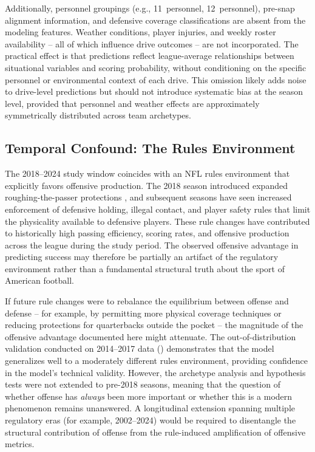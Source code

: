 Additionally, personnel groupings (e.g., 11~personnel, 12~personnel), pre-snap
alignment information, and defensive coverage classifications are absent from
the modeling features. Weather conditions, player injuries, and weekly roster
availability -- all of which influence drive outcomes -- are not incorporated. The
practical effect is that \xscore{} predictions reflect league-average
relationships between situational variables and scoring probability, without
conditioning on the specific personnel or environmental context of each drive.
This omission likely adds noise to drive-level predictions but should not
introduce systematic bias at the season level, provided that personnel and
weather effects are approximately symmetrically distributed across team
archetypes.

\subsection{Temporal Confound: The Rules Environment}
\label{sec:lim-temporal}

The 2018--2024 study window coincides with an NFL rules environment that
explicitly favors offensive production. The 2018 season introduced expanded
roughing-the-passer protections \parencite{pereira2018roughing}, and subsequent seasons have seen increased
enforcement of defensive holding, illegal contact, and player safety rules that
limit the physicality available to defensive players. These rule changes have
contributed to historically high passing efficiency, scoring rates, and offensive
production across the league during the study period. The observed offensive
advantage in predicting success may therefore be partially an artifact of the
regulatory environment rather than a fundamental structural truth about the
sport of American football.

If future rule changes were to rebalance the equilibrium between offense
and defense -- for example, by permitting more physical coverage techniques
or reducing protections for quarterbacks outside the pocket -- the magnitude
of the offensive advantage documented here might attenuate. The
out-of-distribution validation conducted on 2014--2017 data
() demonstrates that the \xscore{} model generalizes well
to a moderately different rules environment, providing confidence in the
model's technical validity. However, the archetype analysis
and hypothesis tests were not extended to pre-2018 seasons, meaning that the
question of whether offense has \emph{always} been more important or whether
this is a modern phenomenon remains unanswered. A longitudinal extension
spanning multiple regulatory eras (for example, 2002--2024) would be required to
disentangle the structural contribution of offense from the rule-induced
amplification of offensive metrics.


